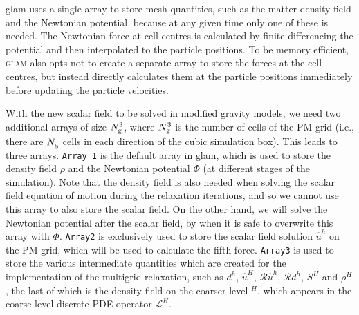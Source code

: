 {\sc glam} uses a single array to store mesh quantities, such as the matter density field and the Newtonian potential, because at any given time only one of these is needed. The Newtonian force at cell centres is calculated by finite-differencing the potential and then interpolated to the particle positions. To be memory efficient, \textsc{glam} also opts not to create a separate array to store the forces at the cell centres, but instead directly calculates them at the particle positions immediately before updating the particle velocities.

With the new scalar field to be solved in modified gravity models, we need two additional arrays of size $N_{\rm g}^3$, where $N_{\rm g}^3$ is the number of cells of the PM grid (i.e., there are $N_{\rm g}$ cells in each direction of the cubic simulation box). This leads to three arrays. \texttt{Array 1} is the default array in {\sc glam}, which is used to store the density field $\rho$ and the Newtonian potential $\Phi$ (at different stages of the simulation). Note that the density field is also needed when solving the scalar field equation of motion during the relaxation iterations, and so we cannot use this array to also store the scalar field. On the other hand, we will solve the Newtonian potential after the scalar field, by when it is safe to overwrite this array with $\Phi$. \texttt{Array2} is exclusively used to store the scalar field solution $\hat{u}^h$ on the PM grid, which will be used to calculate the fifth force. \texttt{Array3} is used to store the various intermediate quantities which are created for the implementation of the multigrid relaxation, such as $d^h$, $\hat{u}^H$, $\mathcal{R}\hat{u}^h$, $\mathcal{R}d^h$, $S^H$ and $\rho^H$, the last of which is the density field on the coarser level $^H$, which appears in the coarse-level discrete PDE operator $\mathcal{L}^H$.

